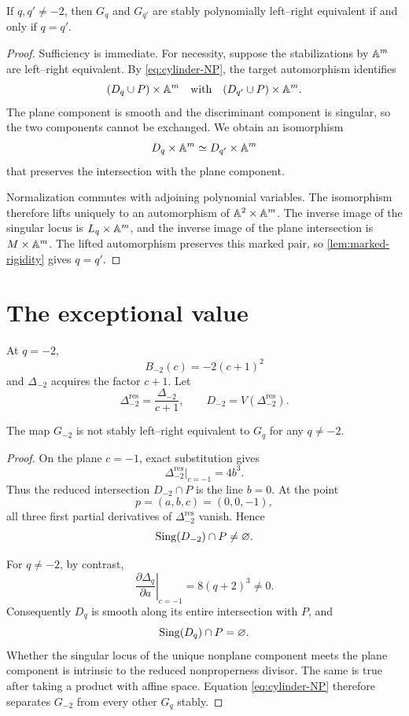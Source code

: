 \documentclass[11pt,reqno]{amsart}
\begin{document}
\begin{theorem}
\label{thm:stable-nonexceptional}
If \(q,q'\ne-2\), then \(G_q\) and \(G_{q'}\) are stably polynomially
left--right equivalent if and only if \(q=q'\).
\end{theorem}

\begin{proof}
Sufficiency is immediate.  For necessity, suppose the stabilizations by
\(\mathbb A^m\) are left--right equivalent.  By \eqref{eq:cylinder-NP}, the target
automorphism identifies
\[
(D_q\cup P)\times\mathbb A^m
\quad\text{with}\quad
(D_{q'}\cup P)\times\mathbb A^m.
\]
The plane component is smooth and the discriminant component is singular, so
the two components cannot be exchanged.  We obtain an isomorphism
\[
D_q\times\mathbb A^m\simeq D_{q'}\times\mathbb A^m
\]
that preserves the intersection with the plane component.

Normalization commutes with adjoining polynomial variables.  The isomorphism
therefore lifts uniquely to an automorphism of
\(\mathbb A^2\times\mathbb A^m\).  The inverse image of the singular locus is
\(L_q\times\mathbb A^m\), and the inverse image of the plane intersection is
\(M\times\mathbb A^m\).  The lifted automorphism preserves this marked pair, so
\cref{lem:marked-rigidity} gives \(q=q'\).
\end{proof}

\section{The exceptional value}
\label{sec:exceptional}

At \(q=-2\),
\[
B_{-2}(c)=-2(c+1)^2
\]
and \(\Delta_{-2}\) acquires the factor \(c+1\).  Let
\[
\Delta_{-2}^{\mathrm{res}}=\frac{\Delta_{-2}}{c+1},
\qquad
D_{-2}=V(\Delta_{-2}^{\mathrm{res}}).
\]

\begin{proposition}
\label{prop:exceptional}
The map \(G_{-2}\) is not stably left--right equivalent to \(G_q\) for any
\(q\ne-2\).
\end{proposition}

\begin{proof}
On the plane \(c=-1\), exact substitution gives
\[
\Delta_{-2}^{\mathrm{res}}|_{c=-1}=4b^3.
\]
Thus the reduced intersection \(D_{-2}\cap P\) is the line \(b=0\).
At the point
\[
p=(a,b,c)=(0,0,-1),
\]
all three first partial derivatives of
\(\Delta_{-2}^{\mathrm{res}}\) vanish.  Hence
\[
\operatorname{Sing}(D_{-2})\cap P\ne\varnothing.
\]

For \(q\ne-2\), by contrast,
\[
\left.\frac{\partial\Delta_q}{\partial a}\right|_{c=-1}
=8(q+2)^3\ne0.
\]
Consequently \(D_q\) is smooth along its entire intersection with \(P\), and
\[
\operatorname{Sing}(D_q)\cap P=\varnothing.
\]
Whether the singular locus of the unique nonplane component meets the plane
component is intrinsic to the reduced nonproperness divisor.  The same is
true after taking a product with affine space.  Equation
\eqref{eq:cylinder-NP} therefore separates \(G_{-2}\) from every other
\(G_q\) stably.
\end{proof}
\end{document}
